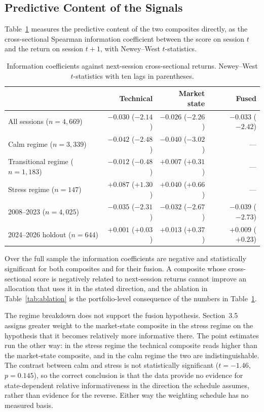 \subsection{Predictive Content of the Signals}
\label{sec:ic}

Table~\ref{tab:ic} measures the predictive content of the two composites directly, as the
cross-sectional Spearman information coefficient between the score on session $t$ and
the return on session $t+1$, with Newey--West $t$-statistics.

\begin{table}[!ht]
\centering
\caption{Information coefficients against next-session cross-sectional returns.
Newey--West $t$-statistics with ten lags in parentheses.}
\label{tab:ic}
\small
\begin{tabular}{p{3.8cm}rrr}
\hline
& \textbf{Technical} & \textbf{Market state} & \textbf{Fused} \\
\hline
All sessions ($n=4{,}669$) & $-0.030$ ($-2.14$) & $-0.026$ ($-2.26$) & $-0.033$ ($-2.42$) \\
Calm regime ($n=3{,}339$) & $-0.042$ ($-2.48$) & $-0.040$ ($-3.02$) & --- \\
Transitional regime ($n=1{,}183$) & $-0.012$ ($-0.48$) & $+0.007$ ($+0.31$) & --- \\
Stress regime ($n=147$) & $+0.087$ ($+1.30$) & $+0.040$ ($+0.66$) & --- \\
\hline
2008--2023 ($n=4{,}025$) & $-0.035$ ($-2.31$) & $-0.032$ ($-2.67$) & $-0.039$ ($-2.73$) \\
2024--2026 holdout ($n=644$) & $+0.001$ ($+0.03$) & $+0.013$ ($+0.37$) & $+0.009$ ($+0.23$) \\
\hline
\end{tabular}
\end{table}

Over the full sample the information coefficients are negative and statistically
significant for both composites and for their fusion. A composite whose cross-sectional
score is negatively related to next-session returns cannot improve an allocation that
uses it in the stated direction, and the ablation in Table~\ref{tab:ablation} is the
portfolio-level consequence of the numbers in Table~\ref{tab:ic}.

The regime breakdown does not support the fusion hypothesis. Section~3.5 assigns greater
weight to the market-state composite in the stress regime on the hypothesis that it
becomes relatively more informative there. The point estimates run the other way: in the
stress regime the technical composite reads higher than the market-state composite, and
in the calm regime the two are indistinguishable. The contrast between calm and stress is
not statistically significant ($t = -1.46$, $p = 0.145$), so the correct conclusion is
that the data provide no evidence for state-dependent relative informativeness in the
direction the schedule assumes, rather than evidence for the reverse. Either way the
weighting schedule has no measured basis.


